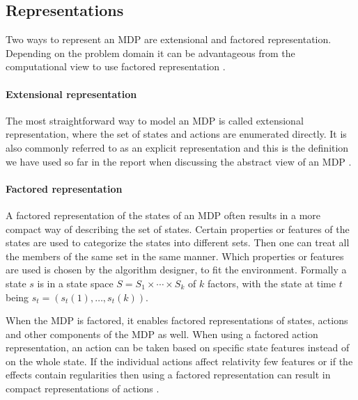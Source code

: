\subsection{Representations}

Two ways to represent an MDP are extensional and factored
representation. Depending on the problem domain it can be advantageous from the
computational view to use factored representation
\parencite{dean1999descision}.

\paragraph{Extensional representation}

The most straightforward way to model an MDP is called extensional
representation, where the set of states and actions are enumerated directly. It
is also commonly referred to as an explicit representation and this is the definition we have used so far in the report when discussing the abstract
view of an MDP \parencite{dean1999descision}.

\paragraph{Factored representation} 
\label{sec:factored_mdp}

A factored representation of the states of an MDP often results in a more
compact way of describing the set of states.  Certain properties or features of
the states are used to categorize the states into different sets. Then one can
treat all the members of the same set in the same manner. Which properties or
features are used is chosen by the algorithm designer, to fit the environment.
Formally a state $s$ is in a state space $S = S_1 \times \cdots \times S_k$
of $k$ factors, with the state at time $t$ being $s_t = (s_t(1), \ldots,
s_t(k))$.


When the MDP is factored, it enables factored representations of states,
actions and other components of the MDP as well. When using a factored action
representation, an action can be taken based on specific state features instead
of on the whole state. If the individual actions affect relativity few features
or if the effects contain regularities then using a factored representation can
result in compact representations of actions \parencite{dean1999descision}. 
